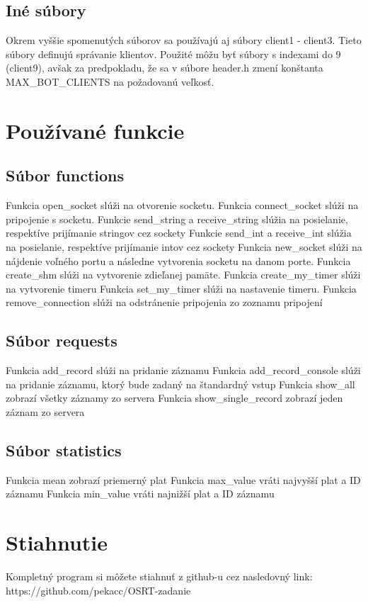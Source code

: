 \documentclass{article}
\begin{document}
\subsection{Iné súbory}
Okrem vyššie spomenutých súborov sa používajú aj súbory client1 - client3. Tieto súbory definujú
správanie klientov. Použité môžu byť súbory s indexami do 9 (client9), avšak za predpokladu, že sa
v súbore header.h zmení konštanta MAX\_BOT\_CLIENTS na požadovanú veľkosť.

\section{Používané funkcie}
\subsection{Súbor functions}
Funkcia open\_socket slúži na otvorenie socketu.
\newline
Funkcia connect\_socket slúži na pripojenie s socketu.
\newline
Funkcie send\_string a receive\_string slúžia na posielanie, respektíve prijímanie stringov cez
sockety
\newline
Funkcie send\_int a receive\_int slúžia na posielanie, respektíve prijímanie intov cez sockety
\newline
Funkcia new\_socket slúži na nájdenie voľného portu a následne vytvorenia socketu na danom porte.
\newline
Funkcia create\_shm slúži na vytvorenie zdieľanej pamäte.
\newline
Funkcia create\_my\_timer slúži na vytvorenie timeru
\newline
Funkcia set\_my\_timer slúži na nastavenie timeru.
\newline
Funkcia remove\_connection slúži na odstránenie pripojenia zo zoznamu pripojení

\subsection{Súbor requests}
Funkcia add\_record slúži na pridanie záznamu
\newline
Funkcia add\_record\_console slúži na pridanie záznamu, ktorý bude zadaný na štandardný vstup
\newline
Funkcia show\_all zobrazí všetky záznamy zo servera
\newline
Funkcia show\_single\_record zobrazí jeden záznam zo servera

\subsection{Súbor statistics}
Funkcia mean zobrazí priemerný plat
\newline
Funkcia max\_value vráti najvyšší plat a ID záznamu
\newline
Funkcia min\_value vráti najnižší plat a ID záznamu

\section{Stiahnutie}
Kompletný program si môžete stiahnuť z github-u cez nasledovný link:
\newline
https://github.com/pekacc/OSRT-zadanie
\end{document}
